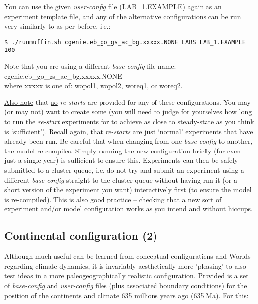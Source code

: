 \documentclass[11pt,fleqn]{book} %
\begin{document}
You can use the given \textit{user-config} file (\textsf{\footnotesize LAB\_1.EXAMPLE}) again as an experiment template file, and any of the alternative configurations can be run very similarly to as per before, i.e.:

\vspace{-2mm}
\begin{verbatim}
$ ./runmuffin.sh cgenie.eb_go_gs_ac_bg.xxxxx.NONE LABS LAB_1.EXAMPLE 100
\end{verbatim}
\vspace{-2mm}

Note that you are using a different \textit{base-config} file name: \textsf{\footnotesize cgenie.eb\_go\_gs\_ac\_bg.xxxxx.NONE}
\\where \textsf{\footnotesize xxxxx} is one of: \textsf{\footnotesize wopol1}, \textsf{\footnotesize wopol2}, \textsf{\footnotesize woreq1}, or \textsf{\footnotesize woreq2}.

\uline{Also note} that \uline{no} \textit{re-starts} are provided for any of these configurations. You may (or may not) want to create some (you will need to judge for yourselves how long to run the \textit{re-start} experiments for to achieve as close to steady-state as you think is ‘sufficient’). Recall again, that \textit{re-starts} are just ‘normal’ experiments that have already been run.
Be careful that when changing from one \textit{base-config} to another, the model re-compiles. Simply running the new configuration briefly (for even just a single year) is sufficient to ensure this. Experiments can then be safely submitted to a cluster queue, i.e. do not try and submit an experiment using a different \textit{base-config} straight to the cluster queue without having run it (or a short version of the experiment you want) interactively first (to ensure the model is re-compiled). This is also good practice – checking that a new sort of experiment and/or model configuration works as you intend and without hiccups.


\subsection{Continental configuration (2)}

Although much useful can be learned from conceptual configurations and Worlds regarding climate dynamics, it is invariably aesthetically more 'pleasing' to also test ideas in a more paleogeographically realistic configuration. Provided is a set of \textit{base-config} and \textit{user-config} files (plus associated boundary conditions) for the position of the continents and climate 635 millions years ago (635 Ma). For this:
\end{document}
